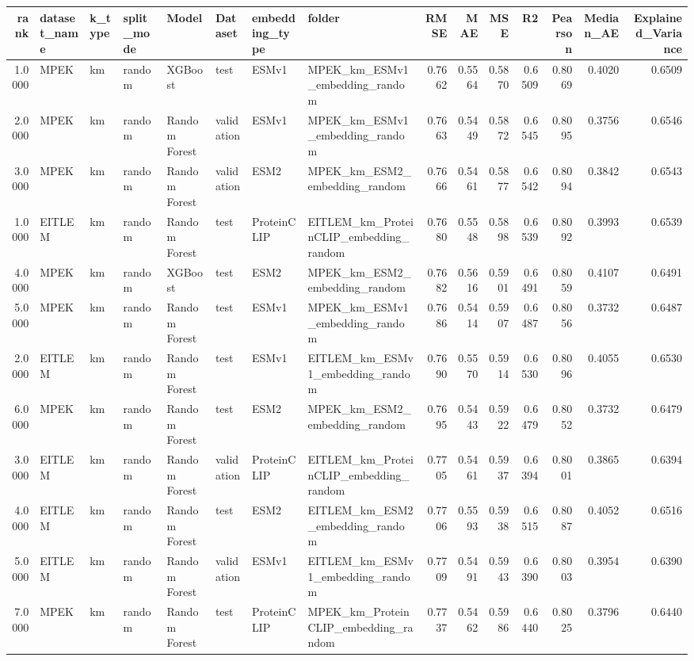 \begin{tabular}{rlllllllrrrrrrr}
\toprule
rank & dataset_name & k_type & split_mode & Model & Dataset & embedding_type & folder & RMSE & MAE & MSE & R2 & Pearson & Median_AE & Explained_Variance \\
\midrule
1.0000 & MPEK & km & random & XGBoost & test & ESMv1 & MPEK_km_ESMv1_embedding_random & 0.7662 & 0.5564 & 0.5870 & 0.6509 & 0.8069 & 0.4020 & 0.6509 \\
2.0000 & MPEK & km & random & Random Forest & validation & ESMv1 & MPEK_km_ESMv1_embedding_random & 0.7663 & 0.5449 & 0.5872 & 0.6545 & 0.8095 & 0.3756 & 0.6546 \\
3.0000 & MPEK & km & random & Random Forest & validation & ESM2 & MPEK_km_ESM2_embedding_random & 0.7666 & 0.5461 & 0.5877 & 0.6542 & 0.8094 & 0.3842 & 0.6543 \\
1.0000 & EITLEM & km & random & Random Forest & test & ProteinCLIP & EITLEM_km_ProteinCLIP_embedding_random & 0.7680 & 0.5548 & 0.5898 & 0.6539 & 0.8092 & 0.3993 & 0.6539 \\
4.0000 & MPEK & km & random & XGBoost & test & ESM2 & MPEK_km_ESM2_embedding_random & 0.7682 & 0.5616 & 0.5901 & 0.6491 & 0.8059 & 0.4107 & 0.6491 \\
5.0000 & MPEK & km & random & Random Forest & test & ESMv1 & MPEK_km_ESMv1_embedding_random & 0.7686 & 0.5414 & 0.5907 & 0.6487 & 0.8056 & 0.3732 & 0.6487 \\
2.0000 & EITLEM & km & random & Random Forest & test & ESMv1 & EITLEM_km_ESMv1_embedding_random & 0.7690 & 0.5570 & 0.5914 & 0.6530 & 0.8096 & 0.4055 & 0.6530 \\
6.0000 & MPEK & km & random & Random Forest & test & ESM2 & MPEK_km_ESM2_embedding_random & 0.7695 & 0.5443 & 0.5922 & 0.6479 & 0.8052 & 0.3732 & 0.6479 \\
3.0000 & EITLEM & km & random & Random Forest & validation & ProteinCLIP & EITLEM_km_ProteinCLIP_embedding_random & 0.7705 & 0.5461 & 0.5937 & 0.6394 & 0.8001 & 0.3865 & 0.6394 \\
4.0000 & EITLEM & km & random & Random Forest & test & ESM2 & EITLEM_km_ESM2_embedding_random & 0.7706 & 0.5593 & 0.5938 & 0.6515 & 0.8087 & 0.4052 & 0.6516 \\
5.0000 & EITLEM & km & random & Random Forest & validation & ESMv1 & EITLEM_km_ESMv1_embedding_random & 0.7709 & 0.5491 & 0.5943 & 0.6390 & 0.8003 & 0.3954 & 0.6390 \\
7.0000 & MPEK & km & random & Random Forest & test & ProteinCLIP & MPEK_km_ProteinCLIP_embedding_random & 0.7737 & 0.5462 & 0.5986 & 0.6440 & 0.8025 & 0.3796 & 0.6440 \\

\end{tabular}
